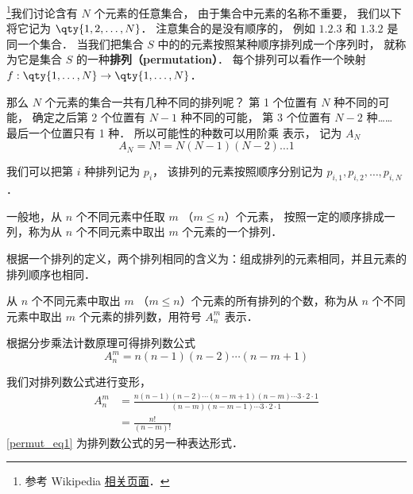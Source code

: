 


\footnote{参考 Wikipedia \href{https://en.wikipedia.org/wiki/Permutation}{相关页面}．}我们讨论含有 $N$ 个元素的任意集合， 由于集合中元素的名称不重要， 我们以下将它记为 $\qty{1,2,\dots, N}$． 注意集合的是没有顺序的， 例如 $\qty{1,2,3}$ 和 $\qty{1,3,2}$ 是同一个集合． 当我们把集合 $S$ 中的的元素按照某种顺序排列成一个序列时， 就称为它是集合 $S$ 的一种\textbf{排列（permutation）}． 每个排列可以看作一个映射 $f:\qty{1,\dots,N}\to\qty{1,\dots,N}$．

那么 $N$ 个元素的集合一共有几种不同的排列呢？ 第 1 个位置有 $N$ 种不同的可能， 确定之后第 2 个位置有 $N-1$ 种不同的可能， 第 3 个位置有 $N-2$ 种…… 最后一个位置只有 1 种． 所以可能性的种数可以用阶乘 表示， 记为 $A_N$
\begin{equation}
A_N = N! = N(N-1)(N-2)\dots 1
\end{equation}

我们可以把第 $i$ 种排列记为 $p_i$， 该排列的元素按照顺序分别记为 $p_{i,1}, p_{i,2}, \dots, p_{i,N}$．

一般地，从 $n$ 个不同元素中任取 $m$ （$m \leq n$）个元素， 按照一定的顺序排成一列，称为从 $n$ 个不同元素中取出 $m$ 个元素的一个排列．

根据一个排列的定义，两个排列相同的含义为：组成排列的元素相同，并且元素的排列顺序也相同．

从 $n$ 个不同元素中取出 $m$ （$m \leq n$）个元素的所有排列的个数，称为从 $n$ 个不同元素中取出 $m$ 个元素的排列数，用符号 $A_n^m$ 表示．

根据分步乘法计数原理可得排列数公式\begin{equation}
A_n^m = n (n - 1)(n - 2) \cdots (n - m + 1)
\end{equation}

我们对排列数公式进行变形，\begin{equation}\label{permut_eq1}
\begin{aligned}
A_n^m &= \frac{n(n - 1)(n - 2)\cdots(n - m + 1)(n - m)\cdots 3\cdot 2 \cdot 1}{(n - m)(n - m -1)\cdots 3\cdot 2 \cdot 1}\\
&=\frac{n!}{(n - m)!}
\end{aligned}
\end{equation}
\autoref{permut_eq1} 为排列数公式的另一种表达形式．
